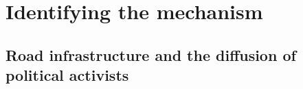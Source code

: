\documentclass[12pt, notitlepage]{article}
\begin{document}
%
%
%
%

\section*{Identifying the mechanism}

\subsection*{Road infrastructure and the diffusion of political activists}
\end{document}

